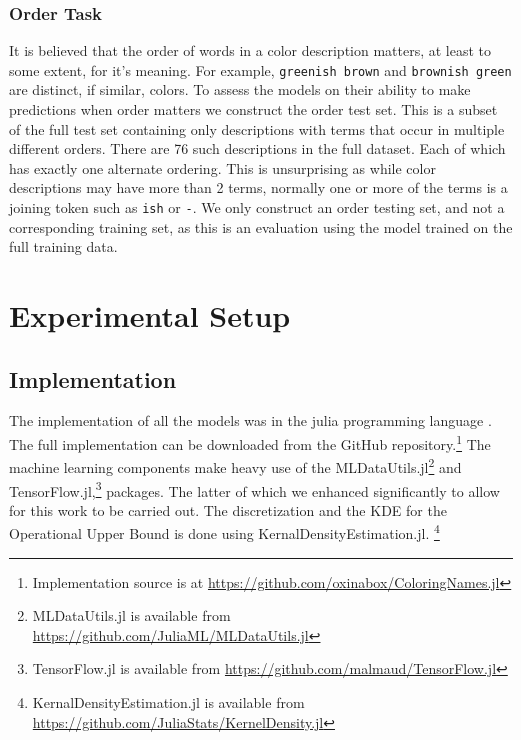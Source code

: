 \documentclass[]{clv3}
\newcommand{\parencite}{\citep}
\newcommand{\natlang}[1]{\texttt{#1}}
\begin{document}
\subsubsection{Order Task}
It is believed that the order of words in a color description matters, at least to some extent, for it's meaning.
For example, \natlang{greenish brown} and \natlang{brownish green} are distinct, if similar, colors.
To assess the models on their ability to make predictions when order matters we construct the order test set.
This is a subset of the full test set containing only descriptions with terms that occur in multiple different orders.
There are 76 such descriptions in the full dataset.
Each of which has exactly one alternate ordering.
This is unsurprising as while color descriptions may have more than 2 terms, normally one or more of the terms is a joining token such as \natlang{ish} or \natlang{-}.
We only construct an order testing set, and not a corresponding training set, as this is an evaluation using the model trained on the full training data.




\section{Experimental Setup}

\subsection{Implementation}
The implementation of all the models was in the julia programming language \parencite{Julia}.
The full implementation can be downloaded from the GitHub repository.\footnote{Implementation source is at \url{https://github.com/oxinabox/ColoringNames.jl}}
The machine learning components make heavy use of the MLDataUtils.jl\footnote{MLDataUtils.jl is available from \url{https://github.com/JuliaML/MLDataUtils.jl}} and TensorFlow.jl,\footnote{TensorFlow.jl is available from \url{https://github.com/malmaud/TensorFlow.jl}} packages.
The latter of which we enhanced significantly to allow for this work to be carried out.
The discretization and the KDE for the Operational Upper Bound is done using KernalDensityEstimation.jl.%
\footnote{KernalDensityEstimation.jl  is available from \url{https://github.com/JuliaStats/KernelDensity.jl}}
\end{document}
